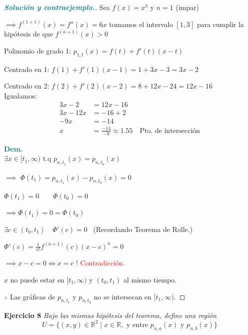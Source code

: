 \documentclass[12pt, letterpaper]{article}
\begin{document}
\begin{proof}[\textbf{\textcolor{teal}{Solución y contraejemplo.}}]
    Sea $f(x) = x^3$ y $n = 1$ (impar)
    
    $\implies f^{(1+1)}(x) = f''(x) = 6x$ tomamos el intervalo $[1,3]$ para cumplir la hipótesis de que $f^{(n+1)}(x) > 0$
    
    Polinomio de grado 1: $p_{1,t}(x) = f(t) + f'(t)(x-t)$
    
    Centrado en 1: $f(1) + f'(1)(x-1) = 1 + 3x - 3 = 3x - 2$
    
    Centrado en 2: $f(2) + f'(2)(x-2) = 8 + 12x - 24 = 12x - 16$\\
    
    Igualamos:
    \begin{align*}
        3x - 2 &= 12x - 16 \\
        3x - 12x &= -16 + 2 \\
        -9x &= -14 \\
        x &= \frac{-14}{-9} \approx 1.55 \quad \text{Pto. de intersección}
    \end{align*}
    
    \textbf{\textcolor{teal}{Dem.}}\\
    $\exists x \in [t_1, \infty)$ t.q $p_{n,t_1}(x) = p_{n,t_0}(x)$
    
    $\implies$ $\Phi(t_1) = p_{n,t_1}(x) - p_{n,t_0}(x) = 0$
    
    $\Phi(t_1) = 0 \qquad \Phi(t_0) = 0$
    
    $\implies \Phi(t_1) = 0 = \Phi(t_0)$
    
    $\exists c \in (t_0, t_1) \quad \Phi'(c) = 0$ \ (Recordando Teorema de Rolle.)
    
    $\Phi'(c) = \frac{1}{n!}f^{(n+1)}(c)(x-c)^n = 0$
    
    $\implies x - c = 0 \iff x = c$ {\textcolor{red}{!  Contradicción.}}
    
    $x$ no puede estar en $[t_1, \infty)$ y $(t_0, t_1)$ al mismo tiempo.
    
    $\therefore$ Las gráficas de $p_{n,t_1}$ y $p_{n,t_0}$ no se intersecan en $[t_1, \infty)$.
\end{proof}

\vspace{0.4cm}
\noindent \textbf{Ejercicio 8} \textit{Bajo las mismas hipótesis del teorema, define una región}
\[ U = \{ (x,y) \in \mathbb{R}^2 \mid x \in \mathbb{R}, \text{ y entre } p_{n,a}(x) \text{ y } p_{n,b}(x) \} \]
\end{document}
